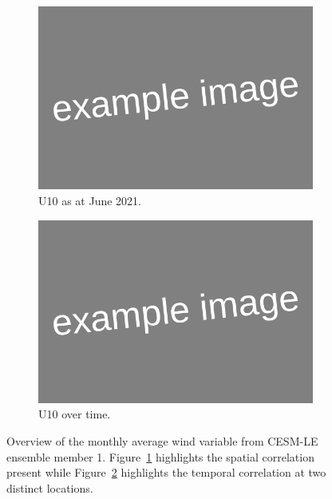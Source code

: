\begin{figure}[htbp!] 
	\centering
	\begin{subfigure}[b]{0.45\textwidth}
		\includegraphics[width=\textwidth]{Example_image}
		\caption{U10 as at June 2021.}
		\label{fig:wind_june}   
	\end{subfigure}             
	\begin{subfigure}[b]{0.45\textwidth}
		\includegraphics[width=\textwidth]{Example_image}
		\caption{U10 over time.}
		\label{fig:wind_temp}
	\end{subfigure}             
	\caption[Overview of Wind variable]{Overview of the monthly average wind variable from CESM-LE ensemble member 1. Figure~\ref{fig:wind_june} highlights the spatial correlation present while Figure~\ref{fig:wind_temp} highlights the temporal correlation at two distinct locations.}
	\label{fig:wind_overview}
\end{figure}

